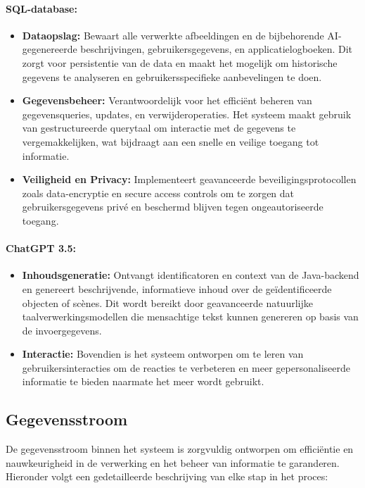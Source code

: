 \paragraph{SQL-database:}
\begin{itemize}
    \item \textbf{Dataopslag:} Bewaart alle verwerkte afbeeldingen en de bijbehorende AI-gegenereerde beschrijvingen, gebruikersgegevens, en applicatielogboeken. Dit zorgt voor persistentie van de data en maakt het mogelijk om historische gegevens te analyseren en gebruikersspecifieke aanbevelingen te doen.
    \item \textbf{Gegevensbeheer:} Verantwoordelijk voor het efficiënt beheren van gegevensqueries, updates, en verwijderoperaties. Het systeem maakt gebruik van gestructureerde querytaal om interactie met de gegevens te vergemakkelijken, wat bijdraagt aan een snelle en veilige toegang tot informatie.
    \item \textbf{Veiligheid en Privacy:} Implementeert geavanceerde beveiligingsprotocollen zoals data-encryptie en secure access controls om te zorgen dat gebruikersgegevens privé en beschermd blijven tegen ongeautoriseerde toegang.
\end{itemize}

\paragraph{ChatGPT 3.5:}
\begin{itemize}
    \item \textbf{Inhoudsgeneratie:} Ontvangt identificatoren en context van de Java-backend en genereert beschrijvende, informatieve inhoud over de geïdentificeerde objecten of scènes. Dit wordt bereikt door geavanceerde natuurlijke taalverwerkingsmodellen die mensachtige tekst kunnen genereren op basis van de invoergegevens.
    \item \textbf{Interactie:} Bovendien is het systeem ontworpen om te leren van gebruikersinteracties om de reacties te verbeteren en meer gepersonaliseerde informatie te bieden naarmate het meer wordt gebruikt.
\end{itemize}

\subsection{Gegevensstroom}

De gegevensstroom binnen het systeem is zorgvuldig ontworpen om efficiëntie en nauwkeurigheid in de verwerking en het beheer van informatie te garanderen. Hieronder volgt een gedetailleerde beschrijving van elke stap in het proces:

